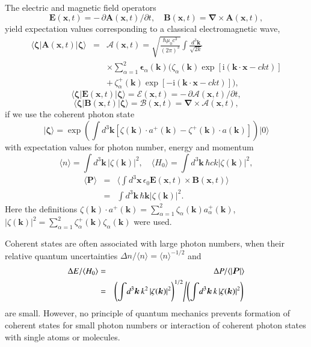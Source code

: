 \documentclass[final,3p,times,twocolumn]{elsarticle3}
\begin{document}
The electric and magnetic field operators
\[
\bm{E}(\bm{x},t)=-\,\partial\bm{A}(\bm{x},t)/\partial t,\quad
\bm{B}(\bm{x},t)=\bm{\nabla}\times\bm{A}(\bm{x},t),
\]
yield expectation values corresponding to a classical electromagnetic wave,
\begin{eqnarray}\nonumber
\bm{\langle}\bm{\zeta}\bm{|}\bm{A}(\bm{x},t)
\bm{|}\bm{\zeta}\bm{\rangle}
&=&\bm{\mathcal{A}}(\bm{x},t)
=\sqrt{\frac{\hbar\mu_0 c^3}{(2\pi)^3}}
\int\frac{d^3\bm{k}}{\sqrt{2k}}
\\ \nonumber
&&\times
\sum_{\alpha=1}^2
\bm{\epsilon}_\alpha(\bm{k})
\Big(\zeta_\alpha(\bm{k})\exp[\mathrm{i}(\bm{k}\cdot\bm{x}-ckt)]
\\ \label{eq:cohA}
&&
+\,\zeta_{\alpha}^+(\bm{k})\exp[-\mathrm{i}(\bm{k}\cdot\bm{x}-ckt)]
\Big),
\end{eqnarray}
\[
\bm{\langle}\bm{\zeta}\bm{|}\bm{E}(\bm{x},t)
\bm{|}\bm{\zeta}\bm{\rangle}
=\bm{\mathcal{E}}(\bm{x},t)
=-\,\partial\bm{\mathcal{A}}(\bm{x},t)/\partial t,
\]
\[
\bm{\langle}\bm{\zeta}\bm{|}\bm{B}(\bm{x},t)
\bm{|}\bm{\zeta}\bm{\rangle}
=\bm{\mathcal{B}}(\bm{x},t)
=\bm{\nabla}\times\bm{\mathcal{A}}(\bm{x},t),
\]
if we use the coherent photon state \cite{glauber}
\[
\bm{|}\bm{\zeta}\bm{\rangle}=\exp\!\left(\int\!d^3\bm{k}
\left[\zeta(\bm{k})\cdot a^+(\bm{k})
-\zeta^+(\bm{k})\cdot a(\bm{k})\right]\right)\!\bm{|}0\bm{\rangle}
\]
with expectation values for photon number, energy and momentum
\[
\langle n\rangle=\int\!d^3\bm{k}\,\left|\zeta(\bm{k})\right|^2,
\quad
\langle H_0\rangle=\int\!d^3\bm{k}\,\hbar ck
\left|\zeta(\bm{k})\right|^2,
\]
\begin{eqnarray*}
\langle\bm{P}\rangle&=&
\langle\int\!d^3\bm{x}\,\epsilon_0\bm{E}(\bm{x},t)
\times\bm{B}(\bm{x},t)\rangle
\\
&=&\int\!d^3\bm{k}\,\hbar\bm{k}
\left|\zeta(\bm{k})\right|^2.
\end{eqnarray*}
Here the definitions $\zeta(\bm{k})\cdot a^+(\bm{k})
=\sum_{\alpha=1}^2\zeta_\alpha(\bm{k})a^+_\alpha(\bm{k})$,
$\left|\zeta(\bm{k})\right|^2
=\sum_{\alpha=1}^2\zeta^+_\alpha(\bm{k})\zeta_\alpha(\bm{k})$
were used.

Coherent states are often associated with large photon numbers,
when their relative quantum uncertainties  
$\Delta n/\langle n\rangle=\langle n\rangle^{-1/2}$ and
\begin{eqnarray*}
\Delta E/\langle H_0\rangle&=&\Delta P/\langle|\bm{P}|\rangle
\\
&=&\left(\int\!d^3\bm{k}\,k^2
\left|\zeta(\bm{k})\right|^2\right)^{1/2}\!\left/
\left(\int\!d^3\bm{k}\,k
\left|\zeta(\bm{k})\right|^2\right)\right.
\end{eqnarray*}
are small.
However, no principle of quantum mechanics prevents formation of coherent
states for small photon numbers or interaction of coherent photon
states with single atoms or molecules.
\end{document}
